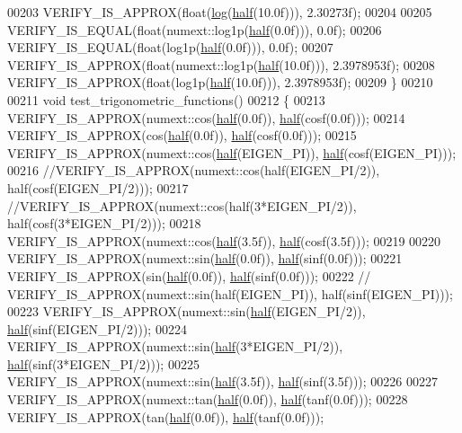 \begin{DoxyCode}
00203   VERIFY\_IS\_APPROX(\textcolor{keywordtype}{float}(\hyperlink{structlog}{log}(\hyperlink{struct_eigen_1_1half}{half}(10.0f))), 2.30273f);
00204 
00205   VERIFY\_IS\_EQUAL(\textcolor{keywordtype}{float}(numext::log1p(\hyperlink{struct_eigen_1_1half}{half}(0.0f))), 0.0f);
00206   VERIFY\_IS\_EQUAL(\textcolor{keywordtype}{float}(log1p(\hyperlink{struct_eigen_1_1half}{half}(0.0f))), 0.0f);
00207   VERIFY\_IS\_APPROX(\textcolor{keywordtype}{float}(numext::log1p(\hyperlink{struct_eigen_1_1half}{half}(10.0f))), 2.3978953f);
00208   VERIFY\_IS\_APPROX(\textcolor{keywordtype}{float}(log1p(\hyperlink{struct_eigen_1_1half}{half}(10.0f))), 2.3978953f);
00209 \}
00210 
00211 \textcolor{keywordtype}{void} test\_trigonometric\_functions()
00212 \{
00213   VERIFY\_IS\_APPROX(numext::cos(\hyperlink{struct_eigen_1_1half}{half}(0.0f)), \hyperlink{struct_eigen_1_1half}{half}(cosf(0.0f)));
00214   VERIFY\_IS\_APPROX(cos(\hyperlink{struct_eigen_1_1half}{half}(0.0f)), \hyperlink{struct_eigen_1_1half}{half}(cosf(0.0f)));
00215   VERIFY\_IS\_APPROX(numext::cos(\hyperlink{struct_eigen_1_1half}{half}(EIGEN\_PI)), \hyperlink{struct_eigen_1_1half}{half}(cosf(EIGEN\_PI)));
00216   \textcolor{comment}{//VERIFY\_IS\_APPROX(numext::cos(half(EIGEN\_PI/2)), half(cosf(EIGEN\_PI/2)));}
00217   \textcolor{comment}{//VERIFY\_IS\_APPROX(numext::cos(half(3*EIGEN\_PI/2)), half(cosf(3*EIGEN\_PI/2)));}
00218   VERIFY\_IS\_APPROX(numext::cos(\hyperlink{struct_eigen_1_1half}{half}(3.5f)), \hyperlink{struct_eigen_1_1half}{half}(cosf(3.5f)));
00219 
00220   VERIFY\_IS\_APPROX(numext::sin(\hyperlink{struct_eigen_1_1half}{half}(0.0f)), \hyperlink{struct_eigen_1_1half}{half}(sinf(0.0f)));
00221   VERIFY\_IS\_APPROX(sin(\hyperlink{struct_eigen_1_1half}{half}(0.0f)), \hyperlink{struct_eigen_1_1half}{half}(sinf(0.0f)));
00222   \textcolor{comment}{//  VERIFY\_IS\_APPROX(numext::sin(half(EIGEN\_PI)), half(sinf(EIGEN\_PI)));}
00223   VERIFY\_IS\_APPROX(numext::sin(\hyperlink{struct_eigen_1_1half}{half}(EIGEN\_PI/2)), \hyperlink{struct_eigen_1_1half}{half}(sinf(EIGEN\_PI/2)));
00224   VERIFY\_IS\_APPROX(numext::sin(\hyperlink{struct_eigen_1_1half}{half}(3*EIGEN\_PI/2)), \hyperlink{struct_eigen_1_1half}{half}(sinf(3*EIGEN\_PI/2)));
00225   VERIFY\_IS\_APPROX(numext::sin(\hyperlink{struct_eigen_1_1half}{half}(3.5f)), \hyperlink{struct_eigen_1_1half}{half}(sinf(3.5f)));
00226 
00227   VERIFY\_IS\_APPROX(numext::tan(\hyperlink{struct_eigen_1_1half}{half}(0.0f)), \hyperlink{struct_eigen_1_1half}{half}(tanf(0.0f)));
00228   VERIFY\_IS\_APPROX(tan(\hyperlink{struct_eigen_1_1half}{half}(0.0f)), \hyperlink{struct_eigen_1_1half}{half}(tanf(0.0f)));

\end{DoxyCode}
